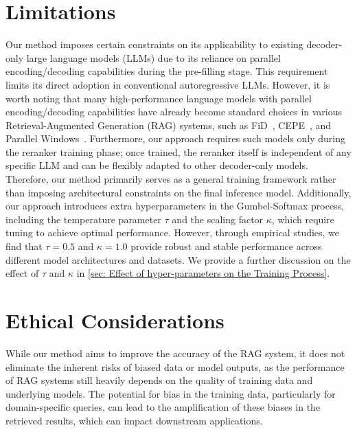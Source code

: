 \section{Limitations}

Our method imposes certain constraints on its applicability to existing decoder-only large language models (LLMs) due to its reliance on parallel encoding/decoding capabilities during the pre-filling stage. This requirement limits its direct adoption in conventional autoregressive LLMs. However, it is worth noting that many high-performance language models with parallel encoding/decoding capabilities have already become standard choices in various Retrieval-Augmented Generation (RAG) systems, such as FiD~\cite{DBLP:conf/eacl/IzacardG21}, CEPE~\cite{DBLP:conf/acl/YenG024}, and Parallel Windows~\cite{DBLP:conf/acl/RatnerLBRMAKSLS23}. Furthermore, our approach requires such models only during the reranker training phase; once trained, the reranker itself is independent of any specific LLM and can be flexibly adapted to other decoder-only models. Therefore, our method primarily serves as a general training framework rather than imposing architectural constraints on the final inference model. Additionally, our approach introduces extra hyperparameters in the Gumbel-Softmax process, including the temperature parameter $\tau$ and the scaling factor $\kappa$, which require tuning to achieve optimal performance. However, through empirical studies, we find that $\tau=0.5$ and $\kappa=1.0$ provide robust and stable performance across different model architectures and datasets. We provide a further discussion on the effect of $\tau$ and $\kappa$ in \autoref{sec: Effect of hyper-parameters on the Training Process}.

\section{Ethical Considerations}
While our method aims to improve the accuracy of the RAG system, it does not eliminate the inherent risks of biased data or model outputs, as the performance of RAG systems still heavily depends on the quality of training data and underlying models. The potential for bias in the training data, particularly for domain-specific queries, can lead to the amplification of these biases in the retrieved results, which can impact downstream applications.